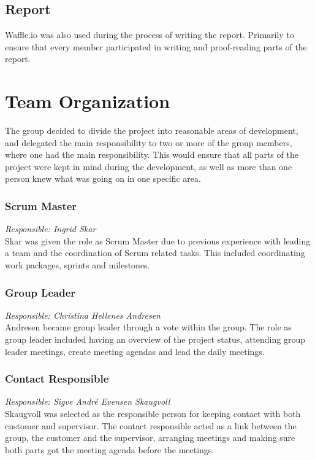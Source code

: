 \subsection{Report}
Waffle.io was also used during the process of writing the report. Primarily to ensure that every member participated in writing and proof-reading parts of the report.

\section{Team Organization}
\label{projectOrganisation}
The group decided to divide the project into reasonable areas of development, and delegated the main responsibility to two or more of the group members, where one had the main responsibility. This would ensure that all parts of the project were kept in mind during the development, as well as more than one person knew what was going on in one specific area.

\subsubsection{Scrum Master}
\textit{Responsible: Ingrid Skar} \\
Skar was given the role as Scrum Master due to previous experience with leading a team and the coordination of Scrum related tasks. This included coordinating work packages, sprints and milestones.

\subsubsection{Group Leader}
\textit{Responsible: Christina Hellenes Andresen} \\
Andresen became group leader through a vote within the group. The role as group leader included having an overview of the project status, attending group leader meetings, create meeting agendas and lead the daily meetings.  

\subsubsection{Contact Responsible}
\textit{Responsible: Sigve André Evensen Skaugvoll} \\
Skaugvoll was selected as the responsible person for keeping contact with both customer and supervisor. The contact responsible acted as a link between the group, the customer and the supervisor, arranging meetings and making sure both parts got the meeting agenda before the meetings.

